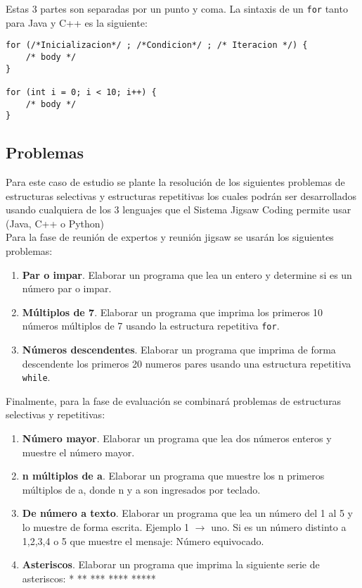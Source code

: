 Estas 3 partes son separadas por un punto y coma. La sintaxis de un \texttt{for} tanto para Java y C++ es la siguiente:

\begin{lstlisting}
for (/*Inicializacion*/ ; /*Condicion*/ ; /* Iteracion */) {
	/* body */
}

for (int i = 0; i < 10; i++) {
	/* body */
}
\end{lstlisting}


\subsection{Problemas}
Para este caso de estudio se plante la resolución de los siguientes problemas de estructuras selectivas y estructuras repetitivas los cuales podrán ser desarrollados usando cualquiera de los 3 lenguajes que el Sistema Jigsaw Coding permite usar (Java, C++ o Python)\\

Para la fase de reunión de expertos y reunión jigsaw se usarán los siguientes problemas:

\begin{enumerate}
	\item \textbf{Par o impar}. Elaborar un programa que lea un entero y determine si es un número par o impar.
	\item \textbf{Múltiplos de 7}. Elaborar un programa que imprima los primeros 10 números múltiplos de 7 usando la estructura repetitiva \texttt{for}.
	\item \textbf{Números descendentes}. Elaborar un programa que imprima de forma descendente los primeros 20 numeros pares usando una estructura repetitiva \texttt{while}.
\end{enumerate}

Finalmente, para la fase de evaluación se combinará problemas de estructuras selectivas y repetitivas:

\begin{enumerate}
 	\item \textbf{Número mayor}. Elaborar un programa que lea dos números enteros y muestre el número mayor.
 	\item \textbf{n múltiplos de a}. Elaborar un programa que muestre los n primeros múltiplos de a, donde n y a son ingresados por teclado.
 	\item \textbf{De número a texto}. Elaborar un programa que lea un número del 1 al 5 y lo muestre de forma escrita. Ejemplo 1 $\longrightarrow$ uno. Si es un número distinto a 1,2,3,4 o 5 que muestre el mensaje: Número equivocado.
 	\item \textbf{Asteriscos}. Elaborar un programa que imprima la siguiente serie de asteriscos: \newline 	
 		\hbox{*} \newline
 		\hbox{**} \newline
 		\hbox{***} \newline
 		\hbox{****} \newline
 		\hbox{*****} 	
\end{enumerate}

